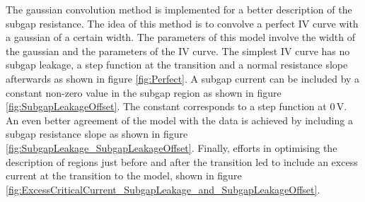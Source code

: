\documentclass[]{article}
\begin{document}
The gaussian convolution method is implemented for a better description of the subgap resistance. The idea of this method is to convolve a perfect IV curve with a gaussian of a certain width. The parameters of this model involve the width of the gaussian and the parameters of the IV curve. The simplest IV curve has no subgap leakage, a step function at the transition and a normal resistance slope afterwards as shown in figure \ref{fig:Perfect}. A subgap current can be included by a constant non-zero value in the subgap region as shown in figure \ref{fig:SubgapLeakageOffset}. The constant corresponds to a step function at 0\,V. An even better agreement of the model with the data is achieved by including a subgap resistance slope as shown in figure \ref{fig:SubgapLeakage_SubgapLeakageOffset}. Finally, efforts in optimising the description of regions just before and after the transition led to include an excess current at the transition to the model, shown in figure \ref{fig:ExcessCriticalCurrent_SubgapLeakage_and_SubgapLeakageOffset}.
\end{document}

